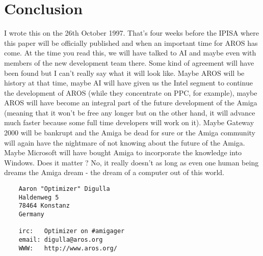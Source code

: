 \part{Conclusion}

I wrote this on the 26th October 1997. That's four weeks before the IPISA
where this paper will be officially published and when an important time
for AROS has come. At the time you read this, we will have talked to AI and
maybe even with members of the new development team there. Some kind of
agreement will have been found but I can't really say what it will look
like. Maybe AROS will be history at that time, maybe AI will have given us
the Intel segment to continue the development of AROS (while they
concentrate on PPC, for example), maybe AROS will have become an integral
part of the future development of the Amiga (meaning that it won't be free
any longer but on the other hand, it will advance much faster because some
full time developers will work on it). Maybe Gateway 2000 will be bankrupt
and the Amiga be dead for sure or the Amiga community will again have the
nightmare of not knowing about the future of the Amiga. Maybe Microsoft
will have bought Amiga to incorporate the knowledge into Windows. Does it
matter ? No, it really doesn't as long as even one human being dreams the
Amiga dream - the dream of a computer out of this world.

\begin{verbatim}
    Aaron "Optimizer" Digulla
    Haldenweg 5
    78464 Konstanz
    Germany

    irc:   Optimizer on #amigager
    email: digulla@aros.org
    WWW:   http://www.aros.org/
\end{verbatim}



